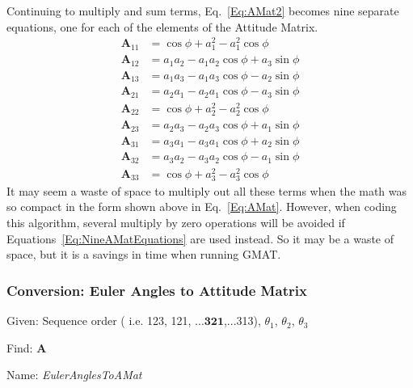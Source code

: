 %
Continuing to multiply and sum terms, Eq.~\ref{Eq:AMat2} becomes nine separate
equations, one for each of the elements of the Attitude Matrix.
%
\begin{equation}
    \begin{aligned}
        \mathbf{A}_{11} &= \cos{\phi} + a_1^2 - a_1^2\cos{\phi}          \\
        \mathbf{A}_{12} &= a_1 a_2 - a_1 a_2 \cos{\phi} + a_3 \sin{\phi} \\
        \mathbf{A}_{13} &= a_1 a_3 - a_1 a_3 \cos{\phi} - a_2 \sin{\phi} \\
        \mathbf{A}_{21} &= a_2 a_1 - a_2 a_1 \cos{\phi} - a_3 \sin{\phi} \\
        \mathbf{A}_{22} &= \cos{\phi} + a_2^2 - a_2^2\cos{\phi}          \\
        \mathbf{A}_{23} &= a_2 a_3 - a_2 a_3 \cos{\phi} + a_1 \sin{\phi} \\
        \mathbf{A}_{31} &= a_3 a_1 - a_3 a_1 \cos{\phi} + a_2 \sin{\phi} \\
        \mathbf{A}_{32} &= a_3 a_2 - a_3 a_2 \cos{\phi} - a_1 \sin{\phi} \\
        \mathbf{A}_{33} &= \cos{\phi} + a_3^2 - a_3^2\cos{\phi}
    \end{aligned}
    \label{Eq:NineAMatEquations}
\end{equation}
%
It may seem a waste of space to multiply out all these terms when the math was so
compact in the form shown above in Eq.~\ref{Eq:AMat}.  However, when coding this
algorithm, several multiply by zero operations will be avoided if
Equations~\ref{Eq:NineAMatEquations} are used instead.  So it may be a waste of
space, but it is a savings in time when running GMAT.
%
\subsubsection{Conversion:  Euler Angles to Attitude Matrix}
\label{sec:EulerAnglestoAMat}

Given:  Sequence order  ( i.e. 123, 121, ...$\boldsymbol{321}$,...313),
$\theta_1$, $\theta_2$, $\theta_3$

\noindent Find: $\mathbf{A}$

\noindent Name:  \emph{EulerAnglesToAMat}

